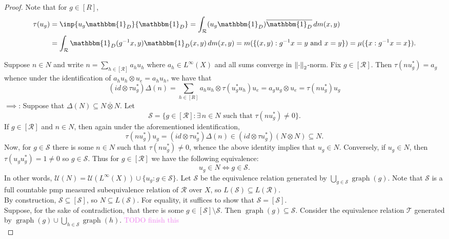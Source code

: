\documentclass[12pt]{article}
\newcommand{\sub}{\subseteq}
\DeclareMathOperator{\graph}{graph}
\newcommand*\cls[1]{\overline{#1}}
\newcommand{\ind}{\mathbbm{1}}
\theoremstyle{definition}
\theoremstyle{plain}
\theoremstyle{remark}
\begin{document}
\begin{proof}
    Note that for $ g\in [R] $,
    \begin{align*}
        \tau(u_{g}) &= \inp{u_{g}\ind_{D}}{\ind_{D}} = \int_{\mathcal{R}} (u_{g}\ind_{D})\cls{\ind_{D}} \dd{m(x,y)}\\
        &=\int_{\mathcal{R}} \ind_{D}(g^{-1}x,y)\ind_{D}(x,y) \dd{m(x,y)} = m(\{(x,y):g^{-1}x = y \text{ and } x = y\}) = \mu(\{x: g^{-1}x = x\}).
    \end{align*}

    Suppose $ n\in N $ and write $ n = \sum_{h\in[\mathcal{R}]}a_{h}u_{h} $ where $ a_{h}\in L^{\infty}(X) $ and all sums converge in $ \norm{\cdot}_{2} $-norm. Fix $ g\in [\mathcal{R}] $. Then $ \tau(nu_{g}^{*}) = a_{g} $ whence under the identification of $ a_{h}u_{h}\otimes u_{e} = a_{h}u_{h} $, we have that
    \[
        (id \otimes \tau u_{g}^{*}) \Delta(n) = \sum_{h\in [R]}a_{h}u_{h} \otimes \tau(u_{g}^{*}u_{h})u_{e} = a_{g}u_{g} \otimes u_{e} = \tau(nu_{g}^{*})u_{g}
    \]
    \underline{$ \implies $}: Suppose that $ \Delta(N)\sub N \cls{\otimes} N $. Let 
    \[
        \mathscr{S} = \{g\in [\mathcal{R}]: \exists\, n\in N \text{ such that } \tau(nu_{g}^{*}) \neq 0\}.
    \]
    If $ g\in [\mathcal{R}] $ and $ n\in N $, then again under the aforementioned identification,
    \[
       \tau(nu_{g}^{*} )u_{g} = (id \otimes \tau u_{g}^{*}) \Delta(n) \in (id \otimes \tau u_{g}^{*})(N \otimes N) \sub N.
    \]
    Now, for $ g\in \mathscr{S} $ there is some $ n\in N $ such that $ \tau(nu_{g}^{*})\neq 0 $, whence the above identity implies that $ u_{g}\in N $. Conversely, if $ u_{g}\in N $, then $ \tau(u_{g}u_{g}^{*}) = 1 \neq 0 $ so $ g\in \mathscr{S} $. Thus for $ g\in[\mathcal{R}] $ we have the following equivalence:
    \[
        u_{g}\in N \iff g\in \mathscr{S}.
    \]
    In other words, $ \mathcal{U}(N) = \mathcal{U}(L^{\infty}(X))\cup \{u_{g}: g\in \mathscr{S}\} $.
    Let $ \mathcal{S} $ be the equivalence relation generated by $ \bigcup_{g\in \mathscr{S}} \graph(g) $. Note that $ \mathcal{S} $ is a full countable pmp measured subequivalence relation of $ \mathcal{R} $ over $ X $, so $ L(\mathcal{S})\sub L(\mathcal{R}) $.\\

    By construction, $ \mathscr{S} \sub [\mathcal{S}] $, so $ N\sub L(\mathcal{S}) $. For equality, it suffices to show that $ \mathscr{S} = [\mathcal{S}] $. \\

    Suppose, for the sake of contradiction, that there is some $ g\in [\mathcal{S}]\setminus \mathscr{S} $. Then $ \graph(g)\sub \mathcal{S} $. Consider the equivalence relation $ \mathcal{T} $ generated by $ \graph(g)\cup\bigcup_{h\in \mathscr{S}}\graph(h) $. \textcolor{violet}{TODO finish this}\\



\end{proof}
\end{document}
